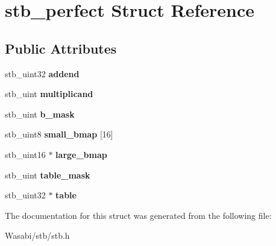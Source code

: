 \hypertarget{structstb__perfect}{}\section{stb\+\_\+perfect Struct Reference}
\label{structstb__perfect}
\subsection*{Public Attributes}
\begin{DoxyCompactItemize}
\item 
stb\+\_\+uint32 {\bfseries addend}\hypertarget{structstb__perfect_a774c56cb45c7ff51468a2e1bf76e89fc}{}\label{structstb__perfect_a774c56cb45c7ff51468a2e1bf76e89fc}

\item 
stb\+\_\+uint {\bfseries multiplicand}\hypertarget{structstb__perfect_aea0195d30c0d3e4019c46f893d9d1b74}{}\label{structstb__perfect_aea0195d30c0d3e4019c46f893d9d1b74}

\item 
stb\+\_\+uint {\bfseries b\+\_\+mask}\hypertarget{structstb__perfect_a888c89f9d8ab910c84842f82eb509fdd}{}\label{structstb__perfect_a888c89f9d8ab910c84842f82eb509fdd}

\item 
stb\+\_\+uint8 {\bfseries small\+\_\+bmap} \mbox{[}16\mbox{]}\hypertarget{structstb__perfect_ad397a0088c63f5f8c3ea99c4ecb3bf4b}{}\label{structstb__perfect_ad397a0088c63f5f8c3ea99c4ecb3bf4b}

\item 
stb\+\_\+uint16 $\ast$ {\bfseries large\+\_\+bmap}\hypertarget{structstb__perfect_ad01dbb0bf8c7e1c4014db1f7e3755df5}{}\label{structstb__perfect_ad01dbb0bf8c7e1c4014db1f7e3755df5}

\item 
stb\+\_\+uint {\bfseries table\+\_\+mask}\hypertarget{structstb__perfect_acd616671ff546c4888b2bc9cd0bae7dd}{}\label{structstb__perfect_acd616671ff546c4888b2bc9cd0bae7dd}

\item 
stb\+\_\+uint32 $\ast$ {\bfseries table}\hypertarget{structstb__perfect_ae6127dce3c811966a811abdf1177956b}{}\label{structstb__perfect_ae6127dce3c811966a811abdf1177956b}

\end{DoxyCompactItemize}


The documentation for this struct was generated from the following file\+:\begin{DoxyCompactItemize}
\item 
Wasabi/stb/stb.\+h\end{DoxyCompactItemize}

